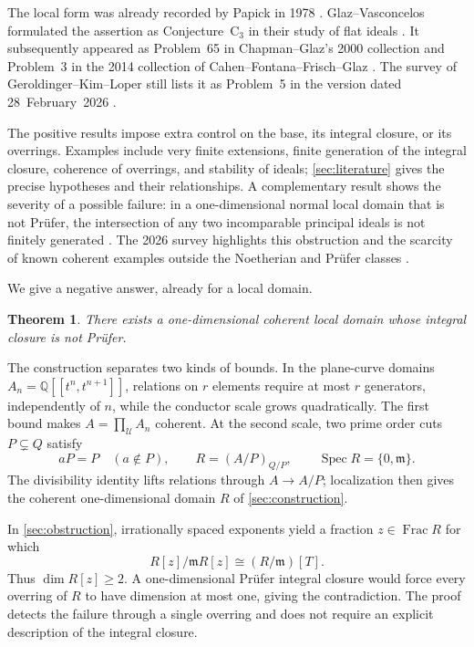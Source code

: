 \documentclass[11pt,reqno]{amsart}
\numberwithin{equation}{section}
\theoremstyle{plain}
\newtheorem{theorem}{Theorem}[section]
\DeclareMathOperator{\Frac}{Frac}
\DeclareMathOperator{\Spec}{Spec}
\newcommand{\QQ}{\mathbb Q}
\newcommand{\UU}{\mathcal U}
\newcommand{\mm}{\mathfrak m}
\begin{document}
The local form was already recorded by Papick in 1978
\cite[\S3]{Papick1978}. Glaz--Vasconcelos formulated the assertion as
Conjecture~C$_3$ in their study of flat ideals
\cite[p.~223]{GlazVasconcelos1984}. It subsequently appeared as
Problem~65 in Chapman--Glaz's 2000 collection
\cite{ChapmanGlaz2000} and Problem~3 in the 2014 collection of
Cahen--Fontana--Frisch--Glaz \cite{CahenFontanaFrischGlaz2014}.
The survey of Geroldinger--Kim--Loper still lists it as Problem~5
in the version dated 28~February~2026
\cite[\S6]{GeroldingerKimLoper2026}.

The positive results impose extra control on the base, its
integral closure, or its overrings. Examples include very finite
extensions, finite generation of the integral closure, coherence of
overrings, and stability of ideals; \cref{sec:literature} gives the
precise hypotheses and their relationships. A complementary result
shows the severity of a possible failure: in a one-dimensional normal
local domain that is not Pr\"ufer, the intersection of any two
incomparable principal ideals is not finitely generated
\cite[Remark~2.2]{GuerrieriLoper2021}. The 2026 survey highlights this
obstruction and the scarcity of known coherent examples outside the
Noetherian and Pr\"ufer classes \cite[\S6]{GeroldingerKimLoper2026}.

We give a negative answer, already for a local domain.

\begin{theorem}\label{thm:main}
There exists a one-dimensional coherent local domain whose integral closure
is not Pr\"ufer.
\end{theorem}

The construction separates two kinds of bounds. In the plane-curve
domains $A_n=\QQ[[t^n,t^{n+1}]]$, relations on $r$ elements require
at most $r$ generators, independently of $n$, while the conductor
scale grows quadratically. The first bound makes
$A=\prod_{\UU}A_n$ coherent. At the second scale, two prime order
cuts $P\subsetneq Q$ satisfy
\[
 aP=P\quad(a\notin P),\qquad
 R=(A/P)_{Q/P},\qquad \Spec R=\{0,\mm\}.
\]
The divisibility identity lifts relations through $A\to A/P$;
localization then gives the coherent one-dimensional domain $R$
of \cref{sec:construction}.

In \cref{sec:obstruction}, irrationally spaced exponents yield a
fraction $z\in\Frac R$ for which
\[
 R[z]/\mm R[z]\cong(R/\mm)[T].
\]
Thus $\dim R[z]\geq2$. A one-dimensional Pr\"ufer integral closure
would force every overring of $R$ to have dimension at most one,
giving the contradiction. The proof detects the failure through a
single overring and does not require an explicit description of the
integral closure.
\end{document}
